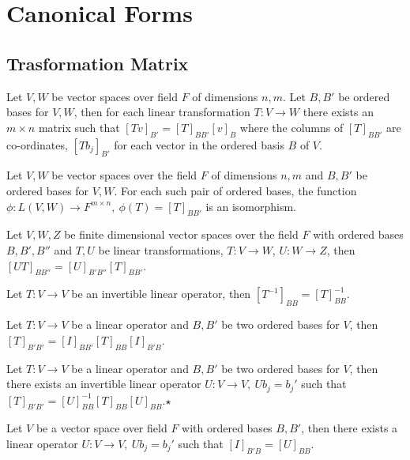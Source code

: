 \chapter{Canonical Forms}
\section{Trasformation Matrix}
	\begin{theorem}
		Let $V,W$ be vector spaces over field $F$ of dimensions $n,m$. Let $B,B'$ be ordered bases for $V,W$, then for each linear transformation $T : V \to W$ there exists an $m \times n$ matrix such that $[Tv]_{B'} = [T]_{BB'}[v]_B$ where the columns of $[T]_{BB'}$ are co-ordinates, $[Tb_j]_{B'}$ for each vector in the ordered basis $B$ of $V$.
	\end{theorem}
	\begin{theorem}
		Let $V,W$ be vector spaces over the field $F$ of dimensions $n,m$ and $B,B'$ be ordered bases for $V,W$. For each such pair of ordered bases, the function $\phi : L(V,W) \to F^{m \times n},\ \phi(T) = [T]_{BB'}$ is an isomorphism.
	\end{theorem}
	\begin{theorem}
		Let $V,W,Z$ be finite dimensional vector spaces over the field $F$ with ordered bases $B,B',B''$ and $T,U$ be linear transformations, $T: V \to W$, $U: W \to Z$, then $[UT]_{BB''} = [U]_{B'B''}[T]_{BB'}$.
	\end{theorem}
	\begin{corollary}
		Let $T : V \to V$ be an invertible linear operator, then $[T^{-1}]_{BB} = [T]_{BB}^{-1}$.
	\end{corollary}
	\begin{corollary}
		Let $T : V \to V$ be a linear operator and $B,B'$ be two ordered bases for $V$, then $[T]_{B'B'} = [I]_{BB'}[T]_{BB}[I]_{B'B}$.
	\end{corollary}
	\begin{theorem}
		Let $T : V \to V$ be a linear operator and $B,B'$ be two ordered bases for $V$, then there exists an invertible linear operator $U : V \to V,\ Ub_j = b_j'$ such that $[T]_{B'B'} = [U]_{BB}^{-1}[T]_{BB}[U]_{BB}$.$\star$
	\end{theorem}
	\begin{remark}
		Let $V$ be a vector space over field $F$ with ordered bases $B,B'$, then there exists a linear operator $U : V \to V,\ Ub_j = b_j'$ such that $[I]_{B'B} = [U]_{BB}$.
	\end{remark}
